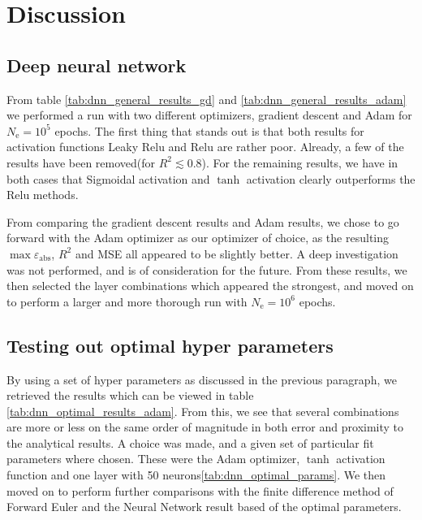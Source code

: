 \section{Discussion}
\subsection{Deep neural network}
From table \ref{tab:dnn_general_results_gd} and \ref{tab:dnn_general_results_adam} we performed a run with two different optimizers, gradient descent and Adam\cite{kingma_adam:_2014} for $N_\mathrm{e}=10^5$ epochs. The first thing that stands out is that both results for activation functions Leaky Relu and Relu are rather poor. Already, a few of the results have been removed(for $R^2\lesssim 0.8$). For the remaining results, we have in both cases that Sigmoidal activation and $\tanh$ activation clearly outperforms the Relu methods. 

From comparing the gradient descent results and Adam results, we chose to go forward with the Adam optimizer as our optimizer of choice, as the resulting $\max{\varepsilon_\mathrm{abs}}$, $R^2$ and MSE all appeared to be slightly better. A deep investigation was not performed, and is of consideration for the future. From these results, we then selected the layer combinations which appeared the strongest, and moved on to perform a larger and more thorough run with $N_\mathrm{e}=10^6$ epochs.

\subsection{Testing out optimal hyper parameters}
By using a set of hyper parameters as discussed in the previous paragraph, we retrieved the results which can be viewed in table \ref{tab:dnn_optimal_results_adam}. From this, we see that several combinations are more or less on the same order of magnitude in both error and proximity to the analytical results. A choice was made, and a given set of particular fit parameters where chosen. These were the Adam optimizer, $\tanh$ activation function and one layer with 50 neurons\ref{tab:dnn_optimal_params}. We then moved on to perform further comparisons with the finite difference method of Forward Euler and the Neural Network result based of the optimal parameters. 

